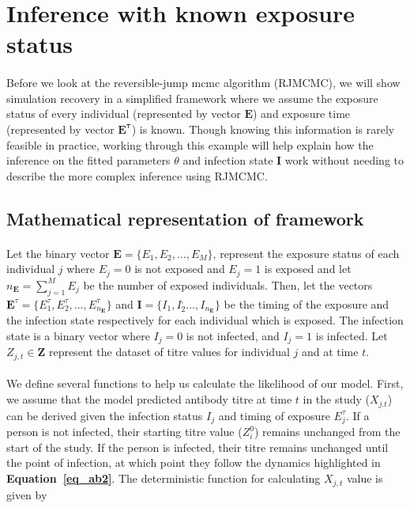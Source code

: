 

\section{Inference with known exposure status}

\paragraph{}Before we look at the reversible-jump mcmc algorithm (RJMCMC),\cite{Green1995-kh} we will show simulation recovery in a simplified framework where we assume the exposure status of every individual (represented by vector $\mathbf{E}$) and exposure time (represented by vector $\mathbf{E^\tau}$) is known. Though knowing this information is rarely feasible in practice, working through this example will help explain how the inference on the fitted parameters $\theta$ and infection state $\mathbf{I}$ work without needing to describe the more complex inference using RJMCMC. 

\subsection{Mathematical representation of framework}

\paragraph{}Let the binary vector $\mathbf{E} = \{ E_1, E_2, \dots, E_M\}$, represent the exposure status of each individual $j$ where $E_j = 0$ is not exposed and $E_j = 1$ is exposed and let $n_\mathbf{E} = \sum_{j = 1}^ME_j$ be the number of exposed individuals. Then, let the vectors $\mathbf{E}^\tau = \{E_1^\tau, E_2^\tau, \dots, E^\tau_{n_\mathbf{E}}\}$ and $\mathbf{I} = \{I_1, I_2^, \dots, I_{n_\mathbf{E}}\}$ be the timing of the exposure and the infection state respectively for each individual which is exposed. The infection state is a binary vector where $I_j = 0$ is not infected, and $I_j = 1$ is infected. Let $Z_{j, t} \in \mathbf{Z}$ represent the dataset of titre values for individual $j$ and at time $t$. 

\paragraph{}We define several functions to help us calculate the likelihood of our model. First, we assume that the model predicted antibody titre at time $t$ in the study ($X_{j.t}$) can be derived given the infection status $I_j$ and timing of exposure $E_j^\tau$. If a person is not infected, their starting titre value ($Z^0_i$) remains unchanged from the start of the study. If the person is infected, their titre remains unchanged until the point of infection, at which point they follow the dynamics highlighted in \textbf{Equation~\ref{eq_ab2}}. The deterministic function for calculating $X_{j,t}$ value is given by

